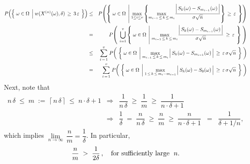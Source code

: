 \begin{eqnarray*}
P\!\left(\left\{\;
	\omega\in\Omega
	\;\left\vert\;
		\overset{{\color{white}1}}{w}(X^{(n)}(\omega),\delta)\,\geq\,3\,\varepsilon
	\right.
\;\right\}\right)
&\leq&
	P\!\left(\left\{\; \omega\in\Omega \;\left\vert\;
		\underset{1\leq i \leq v}{\max}\left\{
		\underset{m_{i-1}\,\leq\,k\,\leq\,m_{i}}{\max}
			\dfrac{\left\vert\, S_{k}(\omega) \overset{{\color{white}.}}{-} S_{m_{i-1}}(\omega) \,\right\vert}{\sigma\sqrt{n}}
		\right\}
		\,\geq\,\varepsilon
		\right.\;\right\}\right)
\\
&=&
	P\!\left(\;\,\overset{v}{\underset{i=1}{\bigcup}}\left\{\; \omega\in\Omega \;\left\vert\;
		\underset{m_{i-1}\,\leq\,k\,\leq\,m_{i}}{\max}
			\dfrac{\left\vert\, S_{k}(\omega) \overset{{\color{white}.}}{-} S_{m_{i-1}}(\omega) \,\right\vert}{\sigma\sqrt{n}}
		\,\geq\,\varepsilon
		\right.\;\right\}
		\;\right)
\\
&\leq& \overset{v}{\underset{i\,=\,1}{\sum}}\;
	P\!\left(\;\left\{\; \omega\in\Omega \;\left\vert\;
		\underset{m_{i-1}\,\leq\,k\,\leq\,m_{i}}{\max}
			\left\vert\, S_{k}(\omega) \overset{{\color{white}.}}{-} S_{m_{i-1}}(\omega) \,\right\vert
		\,\geq\,\varepsilon\,\sigma\sqrt{n}
		\right.\;\right\}
		\;\right)
\\
&=& \overset{v}{\underset{i\,=\,1}{\sum}}\;
	P\!\left(\;\left\{\; \omega\in\Omega \;\left\vert\;
		\underset{1\,\leq\,k\,\leq\,m_{i}-m_{i-1}}{\max}
			\left\vert\, S_{k}(\omega) \overset{{\color{white}.}}{-} S_{0}(\omega) \,\right\vert
		\,\geq\,\varepsilon\,\sigma\sqrt{n}
		\right.\;\right\}
		\;\right)
\end{eqnarray*}
Next, note that
\begin{eqnarray*}
n\,\delta \;\leq\; m \;:=\; \lceil\,n\,\delta\,\rceil \;\leq\; n\cdot\delta + 1
&\Longrightarrow&
	\dfrac{1}{n\,\delta} \;\geq\; \dfrac{1}{m} \;\geq\; \dfrac{1}{n\cdot\delta + 1}
\\
&\Longrightarrow&
	\dfrac{1}{\delta} \;=\; \dfrac{n}{n\,\delta} \;\geq\; \dfrac{n}{m} \;\geq\; \dfrac{n}{n\cdot\delta + 1}
	\;\;=\;\; \dfrac{1}{\delta + 1/n},
\end{eqnarray*}
which implies $\underset{n\rightarrow\infty}{\lim}\,\dfrac{n}{m} = \dfrac{1}{\delta}$.
In particular,
\begin{eqnarray*}
	\dfrac{n}{m} \;>\; \dfrac{1}{2\delta}\,,
	\quad\textnormal{for sufficiently large \;$n$}.
\end{eqnarray*}
